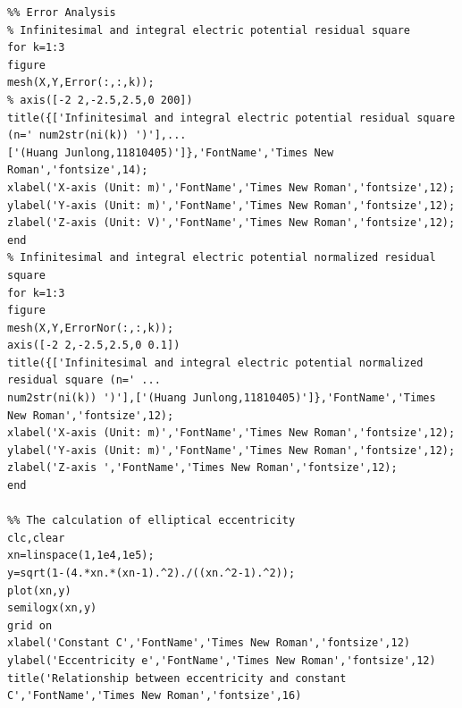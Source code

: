 \documentclass[journal,twocolumn,letterpaper]{IEEEJERM}
\begin{document}
\begin{lstlisting}
%% Error Analysis
% Infinitesimal and integral electric potential residual square
for k=1:3
figure
mesh(X,Y,Error(:,:,k));               
% axis([-2 2,-2.5,2.5,0 200])
title({['Infinitesimal and integral electric potential residual square (n=' num2str(ni(k)) ')'],...
['(Huang Junlong,11810405)']},'FontName','Times New Roman','fontsize',14); 
xlabel('X-axis (Unit: m)','FontName','Times New Roman','fontsize',12);   
ylabel('Y-axis (Unit: m)','FontName','Times New Roman','fontsize',12);   
zlabel('Z-axis (Unit: V)','FontName','Times New Roman','fontsize',12);
end
% Infinitesimal and integral electric potential normalized residual square
for k=1:3
figure
mesh(X,Y,ErrorNor(:,:,k));             
axis([-2 2,-2.5,2.5,0 0.1])
title({['Infinitesimal and integral electric potential normalized residual square (n=' ...
num2str(ni(k)) ')'],['(Huang Junlong,11810405)']},'FontName','Times New Roman','fontsize',12); 
xlabel('X-axis (Unit: m)','FontName','Times New Roman','fontsize',12);   
ylabel('Y-axis (Unit: m)','FontName','Times New Roman','fontsize',12);   
zlabel('Z-axis ','FontName','Times New Roman','fontsize',12);
end

%% The calculation of elliptical eccentricity
clc,clear
xn=linspace(1,1e4,1e5);
y=sqrt(1-(4.*xn.*(xn-1).^2)./((xn.^2-1).^2));
plot(xn,y)
semilogx(xn,y)
grid on
xlabel('Constant C','FontName','Times New Roman','fontsize',12)
ylabel('Eccentricity e','FontName','Times New Roman','fontsize',12)
title('Relationship between eccentricity and constant C','FontName','Times New Roman','fontsize',16)
\end{lstlisting}
\end{document}

